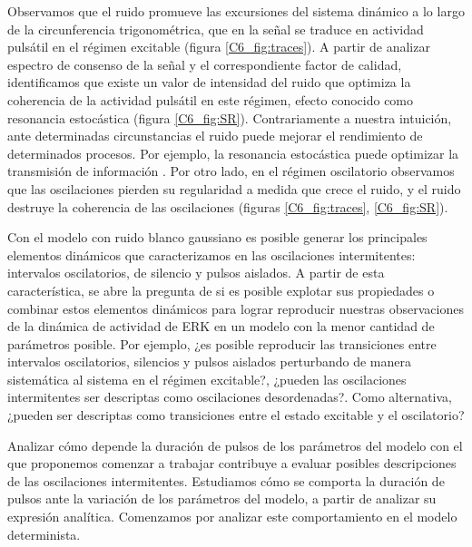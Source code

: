 \documentclass[./main.tex]{subfiles}
\begin{document}
Observamos que el ruido promueve las excursiones del sistema dinámico a lo largo de la circunferencia trigonométrica, que en la señal se traduce en actividad pulsátil en el régimen excitable (figura \ref{C6_fig:traces}). A partir de analizar espectro de consenso de la señal y el correspondiente factor de calidad, identificamos que existe un valor de intensidad del ruido que optimiza la coherencia de la actividad pulsátil en este régimen, efecto conocido como resonancia estocástica (figura \ref{C6_fig:SR}). Contrariamente a nuestra intuición, ante determinadas circunstancias el ruido puede mejorar el rendimiento de determinados procesos. Por ejemplo, la resonancia estocástica puede optimizar la transmisión de información \cite{Gammaitoni1998}. Por otro lado, en el régimen oscilatorio observamos que las oscilaciones pierden su regularidad a medida que crece el ruido, y el ruido destruye la coherencia de las oscilaciones (figuras \ref{C6_fig:traces}, \ref{C6_fig:SR}). 


Con el modelo con ruido blanco gaussiano es posible generar los principales elementos dinámicos que caracterizamos en las oscilaciones intermitentes: intervalos oscilatorios, de silencio y pulsos aislados. A partir de esta característica, se abre la pregunta de si es posible explotar sus propiedades o combinar estos elementos dinámicos para lograr reproducir nuestras observaciones de la dinámica de actividad de ERK en un modelo con la menor cantidad de parámetros posible. Por ejemplo, ¿es posible reproducir las transiciones entre intervalos oscilatorios, silencios y pulsos aislados perturbando de manera sistemática al sistema en el régimen excitable?, ¿pueden las oscilaciones intermitentes ser descriptas como oscilaciones desordenadas?. Como alternativa, ¿pueden ser descriptas como transiciones entre el estado excitable y el oscilatorio? 


Analizar cómo depende la duración de pulsos de los parámetros del modelo con el que proponemos comenzar a trabajar contribuye a evaluar posibles descripciones de las oscilaciones intermitentes. Estudiamos cómo se comporta la duración de pulsos ante la variación de los parámetros del modelo, a partir de analizar su expresión analítica. Comenzamos por analizar este comportamiento en el modelo determinista. 
\end{document}
